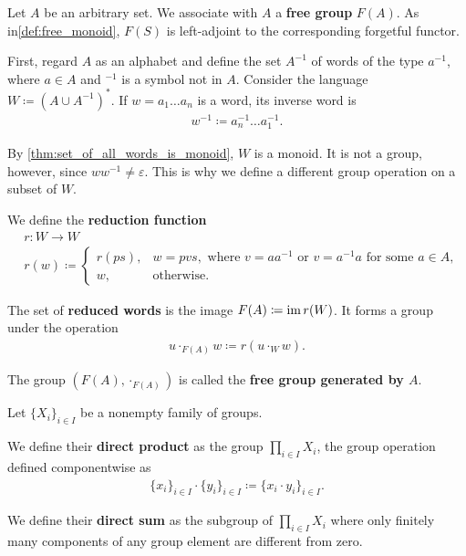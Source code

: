 \begin{definition}\label{def:free_group}\cite[306]{Knapp2016BAlg}
  Let \( A \) be an arbitrary set. We associate with \( A \) a \textbf{free group} \( F(A) \). As in\cref{def:free_monoid}, \( F(S) \) is left-adjoint to the corresponding forgetful functor.

  First, regard \( A \) as an alphabet and define the set \( A^{-1} \) of words of the type \( a^{-1} \), where \( a \in A \) and \( \mbox{}^{-1} \) is a symbol not in \( A \). Consider the language \( W \coloneqq (A \cup A^{-1})^{*} \). If \( w = a_1 \ldots a_n \) is a word, its inverse word is
  \begin{align*}
    w^{-1} \coloneqq a_n^{-1} \ldots a_1^{-1}.
  \end{align*}

  By \cref{thm:set_of_all_words_is_monoid}, \( W \) is a monoid. It is not a group, however, since \( w w^{-1} \neq \varepsilon \). This is why we define a different group operation on a subset of \( W \).

  We define the \textbf{reduction function}
  \begin{align*}
    &r: W \to W \\
    &r(w) \coloneqq \begin{cases}
      r(ps), &w = pvs, \text{ where } v = aa^{-1} \text{ or } v = a^{-1}a \text{ for some } a \in A, \\
      w, &\text{otherwise}.
    \end{cases}
  \end{align*}

  The set of \textbf{reduced words} is the image \( F(A) \coloneqq \operatorname{im} r(W) \). It forms a group under the operation
  \begin{align*}
    u \cdot_{F(A)} w \coloneqq r(u \cdot_{W} w).
  \end{align*}

  The group \( (F(A), \cdot_{F(A)}) \) is called the \textbf{free group generated by \( A \)}.
\end{definition}

\begin{definition}\label{def:group_direct_product}
  Let \( \{ X_i \}_{i \in I} \) be a nonempty family of groups.

  We define their \textbf{direct product} as the group \( \prod_{i \in I} X_i \), the group operation defined componentwise as
  \begin{align*}
    \{ x_i \}_{i \in I} \cdot \{ y_i \}_{i \in I}
    \coloneqq
    \{ x_i \cdot y_i \}_{i \in I}.
  \end{align*}

  We define their \textbf{direct sum} as the subgroup of \( \prod_{i \in I} X_i \) where only finitely many components of any group element are different from zero.
\end{definition}

